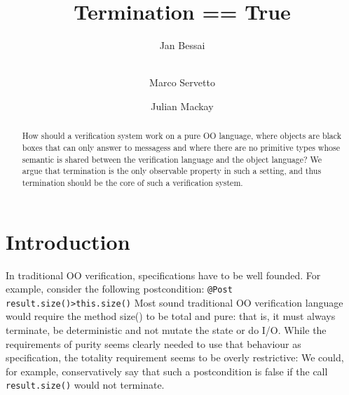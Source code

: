 \documentclass[runningheads]{llncs}
\newcommand{\Q}{\lstinline}
\begin{document}
%
\title{Termination == True }
%
%
\author{Jan Bessai \and\\
Marco Servetto \and
Julian Mackay}
%



%

%
\maketitle              %
%
\begin{abstract}
How should a verification system work on a pure OO language, where objects are black boxes that can only answer to messagess and where there are no primitive types whose semantic is shared between the verification language and the object language?
We argue that termination is the only observable property in such a setting, and thus termination should be the core of such a verification system.


\end{abstract}
%
%
%
\section{Introduction}

In traditional OO verification, specifications have to be well founded.
For example, consider the following postcondition:
\Q!@Post result.size()>this.size()!
Most sound traditional OO verification language would require the method size() to be total and pure: that is, it must always terminate, be deterministic and not mutate the state or do I/O.
While the requirements of purity seems clearly needed to use that behaviour as specification, the totality requirement seems to be overly restrictive:
We could, for example, conservatively say that such a postcondition is false if the call \Q!result.size()! would not terminate.
\end{document}
